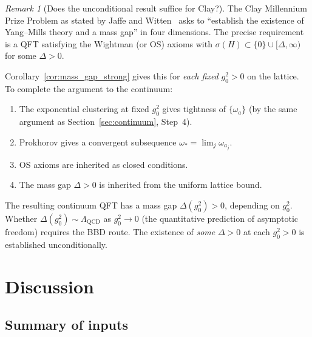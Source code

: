 \documentclass[11pt,a4paper]{article}
\theoremstyle{plain}
\theoremstyle{definition}
\theoremstyle{remark}
\newtheorem{remark}[theorem]{Remark}
\begin{document}
\begin{remark}[Does the unconditional result suffice for Clay?]
\label{rem:clay_dob}
The Clay Millennium Prize Problem as stated by Jaffe and
Witten~\cite{JaffeWitten} asks to ``establish the existence of
Yang--Mills theory and a mass gap'' in four dimensions.
The precise requirement is a QFT satisfying the Wightman
(or OS) axioms with $\sigma(H) \subset \{0\} \cup [\Delta,\infty)$
for some $\Delta > 0$.

Corollary~\ref{cor:mass_gap_strong} gives this for \emph{each
fixed} $g_0^2 > 0$ on the lattice.  To complete the argument
to the continuum:
\begin{enumerate}[label=\textup{(\alph*)},nosep]
  \item The exponential clustering at fixed $g_0^2$ gives
    tightness of $\{\omega_a\}$ (by the same argument as
    Section~\ref{sec:continuum}, Step~4).
  \item Prokhorov gives a convergent subsequence
    $\omega_* = \lim_{j} \omega_{a_j}$.
  \item OS axioms are inherited as closed conditions.
  \item The mass gap $\Delta > 0$ is inherited
    from the uniform lattice bound.
\end{enumerate}
The resulting continuum QFT has a mass gap $\Delta(g_0^2) > 0$,
depending on $g_0^2$.  Whether $\Delta(g_0^2) \sim
\Lambda_{\mathrm{QCD}}$ as $g_0^2 \to 0$ (the quantitative
prediction of asymptotic freedom) requires the BBD route.
The existence of \emph{some} $\Delta > 0$ at each $g_0^2 > 0$
is established unconditionally.
\end{remark}

\section{Discussion}\label{sec:disc}

\subsection{Summary of inputs}
\end{document}
